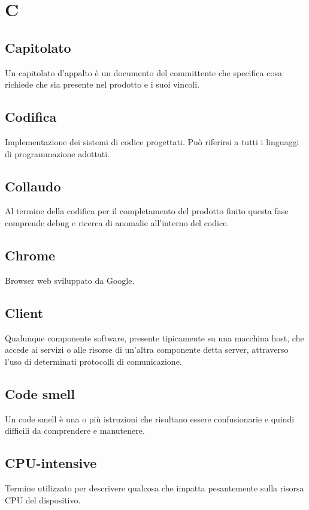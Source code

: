 \section{C}
	\subsection{Capitolato}
		Un capitolato d'appalto è un documento del committente che specifica cosa richiede che sia presente nel prodotto e i suoi vincoli.
	\subsection{Codifica}
		Implementazione dei sistemi di codice progettati. Può riferirsi a tutti i linguaggi di programmazione adottati.
	\subsection{Collaudo}
		Al termine della codifica per il completamento del prodotto finito questa fase comprende debug e ricerca di anomalie all'interno del codice.
	\subsection{Chrome}  
		Browser web sviluppato da Google.
	\subsection{Client}
		 Qualunque componente software, presente tipicamente su una macchina host, che accede ai servizi o alle risorse di un'altra componente detta server, attraverso l'uso di determinati protocolli di comunicazione.
	\subsection{Code smell} 
		Un code smell è una o più istruzioni che risultano essere confusionarie e quindi difficili da comprendere e manutenere.
	\subsection{CPU-intensive}
		Termine utilizzato per descrivere qualcosa che impatta pesantemente sulla risorsa CPU del dispositivo.
	
\newpage
